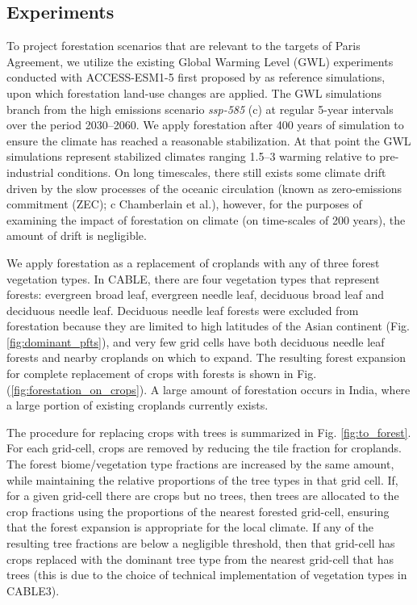 \documentclass[]{article}
\begin{document}
\subsection{Experiments}

To project forestation scenarios that are relevant to the targets of Paris Agreement, we utilize the existing Global Warming Level (GWL) experiments conducted with ACCESS-ESM1-5 first proposed by \cite{king_studying_2021} as reference simulations, upon which forestation land-use changes are applied. The GWL simulations branch from the high emissions scenario \textit{ssp-585} (c) at regular 5-year intervals over the period 2030–2060. We apply forestation after 400 years of simulation to ensure the climate has reached a reasonable stabilization. At that point the GWL simulations represent stabilized climates ranging 1.5–3 \textcelsius warming relative to pre-industrial conditions. On long timescales, there still exists some climate drift driven by the slow processes of the oceanic circulation (known as zero-emissions commitment (ZEC); c Chamberlain et al.), however, for the purposes of examining the impact of forestation on climate (on time-scales of 200 years), the amount of drift is negligible.

We apply forestation as a replacement of croplands with any of three forest vegetation types.
In CABLE, there are four vegetation types that represent forests: evergreen broad leaf, evergreen needle leaf, deciduous broad leaf and deciduous needle leaf.
Deciduous needle leaf forests were excluded from forestation because they are limited to high latitudes of the Asian continent (Fig. \ref{fig:dominant_pfts}), and very few grid cells have both deciduous needle leaf forests and nearby croplands on which to expand.
The resulting forest expansion for complete replacement of crops with forests is shown in Fig. (\ref{fig:forestation_on_crops}).
A large amount of forestation occurs in India, where a large portion of existing croplands currently exists.

The procedure for replacing crops with trees is summarized in Fig. \ref{fig:to_forest}.
For each grid-cell, crops are removed by reducing the tile fraction for croplands.
The forest biome/vegetation type fractions are increased by the same amount, while maintaining the relative proportions of the tree types in that grid cell.
If, for a given grid-cell there are crops but no trees, then trees are allocated to the crop fractions using the proportions of the nearest forested grid-cell, ensuring that the forest expansion is appropriate for the local climate.
If any of the resulting tree fractions are below a negligible threshold, then that grid-cell has crops replaced with the dominant tree type from the nearest grid-cell that has trees (this is due to the choice of technical implementation of vegetation types in CABLE3).
\end{document}
